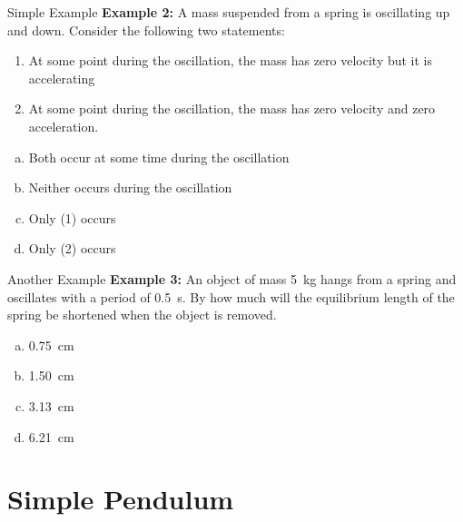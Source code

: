 \documentclass[12pt,compress,aspectratio=169]{beamer}
\begin{document}
\begin{frame}{Simple Example}
  \textbf{Example 2:} A mass suspended from a spring is oscillating up and
  down. Consider the following two statements:
  \begin{enumerate}
  \item At some point during the oscillation, the mass has zero velocity but it
    is accelerating
  \item At some point during the oscillation, the mass has zero velocity and
    zero acceleration.
  \end{enumerate}

  \begin{enumerate}[(a)]
  \item Both occur at some time during the oscillation
  \item Neither occurs during the oscillation
  \item Only (1) occurs
  \item Only (2) occurs
  \end{enumerate}
\end{frame}



\begin{frame}{Another Example}
  \textbf{Example 3:} An object of mass \SI{5}{\kilo\gram} hangs from a spring
  and oscillates with a period of \SI{.5}{\second}. By how much will the
  equilibrium length of the spring be shortened when the object is removed.
  \begin{enumerate}[(a)]
  \item\SI{0.75}{\centi\metre}
  \item\SI{1.50}{\centi\metre}
  \item\SI{3.13}{\centi\metre}
  \item\SI{6.21}{\centi\metre}
  \end{enumerate}
\end{frame}



\section{Simple Pendulum}
\end{document}
